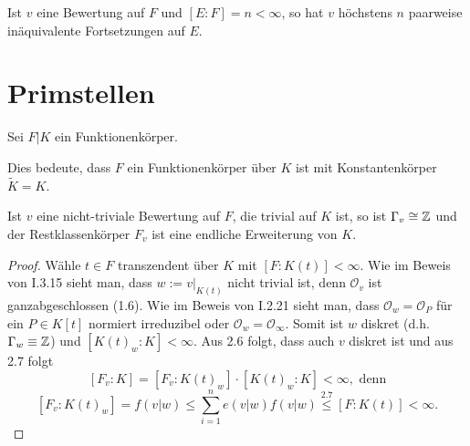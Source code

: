 \begin{korollar}
    Ist $v$ eine Bewertung auf $F$ und $[E:F] = n < \infty$, so hat $v$ höchstens $n$ paarweise inäquivalente
    Fortsetzungen auf $E$.
\end{korollar}

\section{Primstellen}
Sei $F | K$ ein Funktionenkörper.

\begin{definition}
    Dies bedeute, dass $F$ ein Funktionenkörper über $K$ ist mit Konstantenkörper $\widetilde{K}=K$.
\end{definition}

\begin{satz}
    Ist $v$ eine nicht-triviale Bewertung auf $F$, die trivial auf $K$ ist,
    so ist $\Gamma_v \cong \mathbb{Z}$ und der Restklassenkörper $F_v$ ist eine endliche Erweiterung von $K$.
\end{satz}
\begin{proof}
    Wähle $t \in F$ transzendent über $K$ mit $[F:K(t)] < \infty$.
    Wie im Beweis von I.3.15 sieht man, dass $w:= v|_{K(t)}$ nicht trivial ist, denn $\mathcal{O}_v$ ist ganzabgeschlossen (1.6).
    Wie im Beweis von I.2.21 sieht man, dass $\mathcal{O}_w = \mathcal{O}_P$ für ein 
    $P \in K[t]$ normiert irreduzibel oder $\mathcal{O}_w = \mathcal{O}_{\infty}$.
    Somit ist $w$ diskret (d.h. $\Gamma_w \equiv \mathbb{Z}$) und $[K(t)_w:K] < \infty$.
    Aus 2.6 folgt, dass auch $v$ diskret ist und aus 2.7 folgt $$ [F_v:K] = [F_v:K(t)_w]\cdot [K(t)_w:K] < \infty, \text{ denn}$$
    $$ [F_v:K(t)_w] = f(v|w) \leq \sum_{i=1}^n e(v|w)f(v|w) \overset{2.7}{\leq} [F:K(t)] < \infty.$$
\end{proof}


